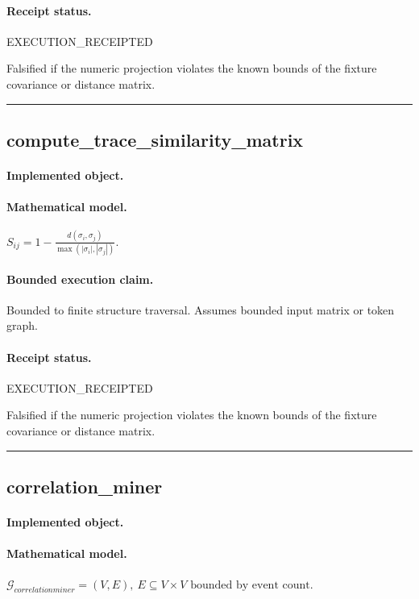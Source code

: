 \paragraph{Receipt status.} EXECUTION\_RECEIPTED
\begin{falsifier}
Falsified if the numeric projection violates the known bounds of the fixture covariance or distance matrix.
\end{falsifier}

\vspace{1em}\hrule\vspace{1em}
\subsection{compute\_trace\_similarity\_matrix}
\paragraph{Implemented object.} 
\paragraph{Mathematical model.} $S_{ij} = 1-\frac{d(\sigma_i,\sigma_j)}{\max(|\sigma_i|,|\sigma_j|)}.$
\paragraph{Bounded execution claim.} Bounded to finite structure traversal. Assumes bounded input matrix or token graph.
\paragraph{Receipt status.} EXECUTION\_RECEIPTED
\begin{falsifier}
Falsified if the numeric projection violates the known bounds of the fixture covariance or distance matrix.
\end{falsifier}

\vspace{1em}\hrule\vspace{1em}
\subsection{correlation\_miner}
\paragraph{Implemented object.} 
\paragraph{Mathematical model.} $\mathcal{G}_{correlationminer} = (V, E), \ E \subseteq V \times V \text{ bounded by event count}.$

